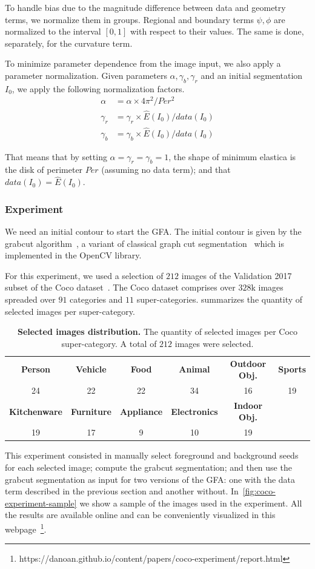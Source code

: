 \documentclass[review]{siamart220329}
\begin{document}
%
%
To handle bias due to the magnitude difference between data and geometry terms, we normalize them in groups. Regional and boundary terms $\psi,\phi$ are normalized to the interval $[0,1]$ with respect to their values. The same is done, separately, for the curvature term.

To minimize parameter dependence from the image input, we also apply a parameter normalization. Given parameters $\alpha, \gamma_b, \gamma_r$ and an initial segmentation $I_0$, we apply the following normalization factors.
%
%
\begin{align*}
	\alpha & = \alpha \times 4\pi^2/Per^2 \\
	\gamma_r & = \gamma_r \times \hat{E}(I_0)/data(I_0) \\	
	\gamma_b & = \gamma_b \times \hat{E}(I_0)/data(I_0)		
\end{align*}

That means that by setting $\alpha=\gamma_r=\gamma_b=1$, the shape of minimum elastica is the disk of perimeter $Per$ (assuming no data term); and that $data(I_0)=\hat{E}(I_0)$.
%
%
\subsubsection{Experiment}
We need an initial contour to start the GFA. The initial contour is given by the grabcut algorithm~\cite{rother04grabcut}, a variant of classical graph cut segmentation~\cite{boykov01graphcut} which is implemented in the OpenCV library.

For this experiment, we used a selection of $212$ images of the Validation 2017 subset of the Coco dataset~\cite{lin2014microsoft}. The Coco dataset comprises over $328$k images spreaded over $91$ categories and $11$ super-categories. summarizes the quantity of selected images per super-category. 
%
%
\begin{table}
\footnotesize
	\caption{\textbf{Selected images distribution.} The quantity of selected images per Coco super-category. A total of $212$ images were selected.}\label{tab:image-categories-distribution}
\begin{tabular}{cccccc}
\textbf{Person} & \textbf{Vehicle} & \textbf{Food} & \textbf{Animal} & \textbf{Outdoor Obj.} & \textbf{Sports} \\
24 & 22 & 22 & 34 & 16 & 19 \\[1em]
\textbf{Kitchenware} & \textbf{Furniture} & \textbf{Appliance} & \textbf{Electronics} & \textbf{Indoor Obj.} & \\
19 & 17 & 9 & 10 & 19 &
\end{tabular}
\end{table}
%
%
This experiment consisted in manually select foreground and background seeds for each selected image; compute the grabcut segmentation; and then use the grabcut segmentation as input for two versions of the GFA: one with the data term described in the previous section and another without. In~\cref{fig:coco-experiment-sample} we show a sample of the images used in the experiment. All the results are available online and can be conveniently visualized in this webpage~\footnote{https://danoan.github.io/content/papers/coco-experiment/report.html}. 
\end{document}
